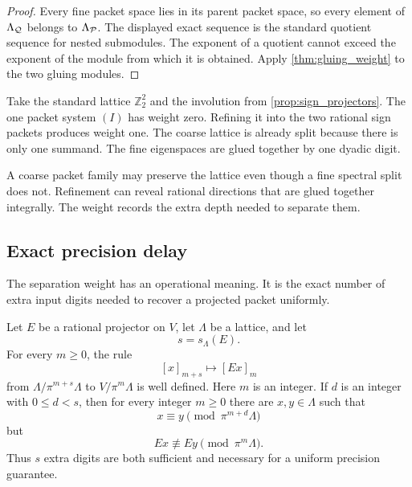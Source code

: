 \begin{proof}
Every fine packet space lies in its parent packet space, so every element of $\Lambda_{\mathcal Q}$ belongs to $\Lambda_{\mathcal P}$.  The displayed exact sequence is the standard quotient sequence for nested submodules.  The exponent of a quotient cannot exceed the exponent of the module from which it is obtained.  Apply \cref{thm:gluing_weight} to the two gluing modules.
\end{proof}

\begin{example}\label{ex:strict_weight_growth}
Take the standard lattice $\mathbb Z_2^2$ and the involution from \cref{prop:sign_projectors}.  The one packet system $(I)$ has weight zero.  Refining it into the two rational sign packets produces weight one.  The coarse lattice is already split because there is only one summand.  The fine eigenspaces are glued together by one dyadic digit.
\end{example}

\begin{remark}\label{rem:strict_growth}
A coarse packet family may preserve the lattice even though a fine spectral split does not.  Refinement can reveal rational directions that are glued together integrally.  The weight records the extra depth needed to separate them.
\end{remark}

\subsection{Exact precision delay}

The separation weight has an operational meaning.  It is the exact number of extra input digits needed to recover a projected packet uniformly.

\enlargethispage{\baselineskip}
\begin{theorem}\label{thm:precision_delay}
Let $E$ be a rational projector on $V$, let $\Lambda$ be a lattice, and let
\[
s=s_\Lambda(E).
\]
For every $m\geq0$, the rule
\[
[x]_{m+s}\longmapsto[Ex]_m
\]
from $\Lambda/\pi^{m+s}\Lambda$ to $V/\pi^m\Lambda$ is well defined.  Here $m$ is an integer.  If $d$ is an integer with $0\leq d<s$, then for every integer $m\geq0$ there are $x,y\in\Lambda$ such that
\[
x\equiv y\pmod{\pi^{m+d}\Lambda}
\]
but
\[
Ex\not\equiv Ey\pmod{\pi^m\Lambda}.
\]
Thus $s$ extra digits are both sufficient and necessary for a uniform precision guarantee.
\end{theorem}

